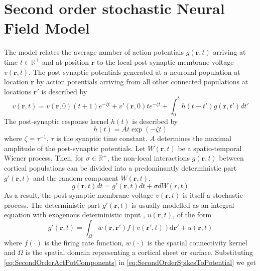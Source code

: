 \documentclass[a4paper,10pt]{article}
\begin{document}
\section{Second order stochastic Neural Field Model}
The model relates the average number of action potentials $g(\mathbf{r},t)$ arriving at time $t \in \mathbb R^{+}$ and at position $\mathbf{r}$ to the local post-synaptic membrane voltage $v(\mathbf{r},t)$. The post-synaptic potentials generated at a neuronal population at location $\mathbf{r}$ by action potentials arriving from all other connected populations at locations $\mathbf{r}'$ is described by 
\begin{equation}
	\label{eq:SecondOrderSpikesToPotential} v\left( {\mathbf{r},t} \right)=v(\mathbf r, 0)(t+1)e^{-\zeta t}+v'(\mathbf r,0)te^{-\zeta t}+\int_0^t {h\left( {t - t'} \right)g\left( {\mathbf{r},t'} \right)dt'} 
\end{equation}
The post-synaptic response kernel $h(t)$ is described by 
\begin{equation}
	\label{eq:SecondOrderSynapticRespKernel} h(t) = At\exp{\left(-\zeta t\right)} 
\end{equation}
where $\zeta=\tau^{-1}$, $\tau$ is the synaptic time constant.  $A$ determines the maximal amplitude of the post-synaptic potentials.
Let $W(\mathbf r,t)$ be a spatio-temporal Wiener process. Then, for $\sigma \in \mathbb R^{+}$, the non-local interactions $g\left( {\mathbf{r},t} \right)$ between cortical populations can be divided into a predominantly deterministic part $g'\left( {\mathbf{r},t} \right) $ and  the random component $W(\mathbf r,t)$,
\begin{equation}\label{eq:SecondOrderActPotComponents}
  g\left( {\mathbf{r},t} \right)dt=g'\left( {\mathbf{r},t} \right)dt+\sigma d W(r,t)
\end{equation}
As a result, the post-synaptic membrane voltage $v(\mathbf r, t)$ is itself a stochastic process. The deterministic part $g'(\mathbf r, t)$ is usually modelled as an integral equation with exogenous deterministic input , $ u(\mathbf r,t)$, of the form \cite{Atay2005}
\begin{equation}
	\label{DeterministicRateBasedInteractions} g'\left( \mathbf{r},t \right) = \int_\Omega {w\left( \mathbf{r},\mathbf{r}' \right)f\left( v\left( \mathbf{r}',t \right) \right)\textrm{d}\mathbf{r}'}+u(\mathbf r,t)
\end{equation}
where $f(\cdot)$ is the firing rate function, $w(\cdot)$ is the spatial connectivity kernel and $\Omega$ is the spatial domain representing a cortical sheet or surface. Substituting \eqref{eq:SecondOrderActPotComponents} in \eqref{eq:SecondOrderSpikesToPotential} we get
\end{document}
